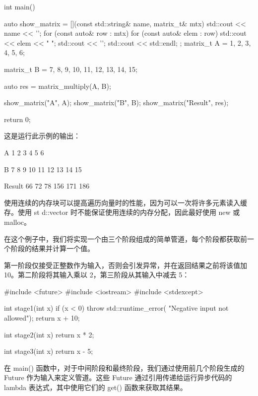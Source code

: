 \begin{cpp}
int main() {
    auto show_matrix = [](const std::string& name,
                          matrix_t& mtx) {
        std::cout << name << '\n';
        for (const auto& row : mtx) {
            for (const auto& elem : row) {
                std::cout << elem << " ";
            }
            std::cout << '\n';
        }
        std::cout << std::endl;
    };
    matrix_t A = {{1, 2, 3},
                  {4, 5, 6}};

    matrix_t B = {{7, 8, 9},
                  {10, 11, 12},
                  {13, 14, 15}};

    auto res = matrix_multiply(A, B);

    show_matrix("A", A);
    show_matrix("B", B);
    show_matrix("Result", res);

    return 0;
}
\end{cpp}

这是运行此示例的输出：

\begin{cpp}
A
1 2 3
4 5 6

B
7 8 9
10 11 12
13 14 15

Result
66 72 78
156 171 186
\end{cpp}

使用连续的内存块可以提高遍历向量时的性能，因为可以一次将许多元素读入缓存。使用 st d::vector 时不能保证使用连续的内存分配，因此最好使用 new 或 malloc。


在这个例子中，我们将实现一个由三个阶段组成的简单管道，每个阶段都获取前一个阶段的结果并计算一个值。


第一阶段仅接受正整数作为输入，否则会引发异常，并在返回结果之前将该值加 10。第二阶段将其输入乘以 2，第三阶段从其输入中减去 5：

\begin{cpp}
#include <future>
#include <iostream>
#include <stdexcept>

int stage1(int x) {
    if (x < 0) throw std::runtime_error(
    "Negative input not allowed");
    return x + 10;
}

int stage2(int x) {
    return x * 2;
}

int stage3(int x) {
    return x - 5;
}
\end{cpp}

在 main() 函数中，对于中间阶段和最终阶段，我们通过使用前几个阶段生成的 Future 作为输入来定义管道。这些 Future 通过引用传递给运行异步代码的 lambda 表达式，其中使用它们的 get() 函数来获取其结果。

